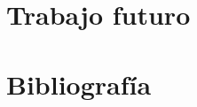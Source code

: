 \documentclass[10pt]{book}
\begin{document}
\chapter{Trabajo futuro}\label{chp:trabajoFuturo}

\chapter{Bibliografía}\label{chp:bibliografia}


%
%



\end{document}
